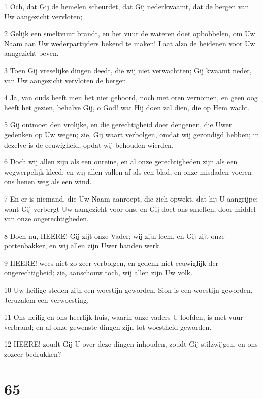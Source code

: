 \par 1 Och, dat Gij de hemelen scheurdet, dat Gij nederkwaamt, dat de bergen van Uw aangezicht vervloten;
\par 2 Gelijk een smeltvuur brandt, en het vuur de wateren doet opbobbelen, om Uw Naam aan Uw wederpartijders bekend te maken! Laat alzo de heidenen voor Uw aangezicht beven.
\par 3 Toen Gij vreselijke dingen deedt, die wij niet verwachtten; Gij kwaamt neder, van Uw aangezicht vervloten de bergen.
\par 4 Ja, van ouds heeft men het niet gehoord, noch met oren vernomen, en geen oog heeft het gezien, behalve Gij, o God! wat Hij doen zal dien, die op Hem wacht.
\par 5 Gij ontmoet den vrolijke, en die gerechtigheid doet dengenen, die Uwer gedenken op Uw wegen; zie, Gij waart verbolgen, omdat wij gezondigd hebben; in dezelve is de eeuwigheid, opdat wij behouden wierden.
\par 6 Doch wij allen zijn als een onreine, en al onze gerechtigheden zijn als een wegwerpelijk kleed; en wij allen vallen af als een blad, en onze misdaden voeren ons henen weg als een wind.
\par 7 En er is niemand, die Uw Naam aanroept, die zich opwekt, dat hij U aangrijpe; want Gij verbergt Uw aangezicht voor ons, en Gij doet ons smelten, door middel van onze ongerechtigheden.
\par 8 Doch nu, HEERE! Gij zijt onze Vader; wij zijn leem, en Gij zijt onze pottenbakker, en wij allen zijn Uwer handen werk.
\par 9 HEERE! wees niet zo zeer verbolgen, en gedenk niet eeuwiglijk der ongerechtigheid; zie, aanschouw toch, wij allen zijn Uw volk.
\par 10 Uw heilige steden zijn een woestijn geworden, Sion is een woestijn geworden, Jeruzalem een verwoesting.
\par 11 Ons heilig en ons heerlijk huis, waarin onze vaders U loofden, is met vuur verbrand; en al onze gewenste dingen zijn tot woestheid geworden.
\par 12 HEERE! zoudt Gij U over deze dingen inhouden, zoudt Gij stilzwijgen, en ons zozeer bedrukken?

\chapter{65}

